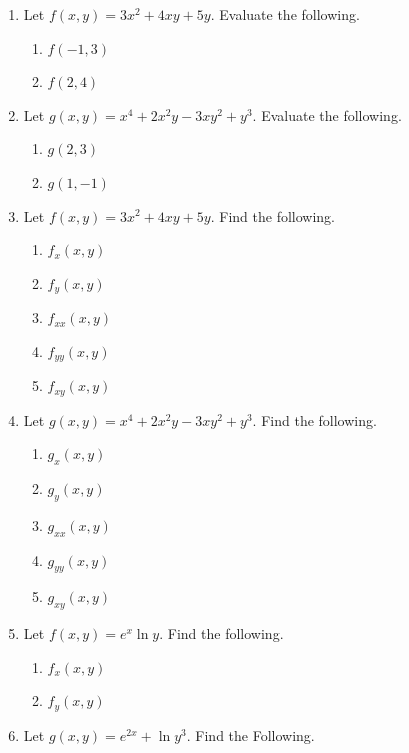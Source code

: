 \documentclass[
]{book}
\providecommand{\tightlist}{%
  \setlength{\itemsep}{0pt}\setlength{\parskip}{0pt}}
\theoremstyle{definition}
\theoremstyle{definition}
\theoremstyle{definition}
\theoremstyle{definition}
\theoremstyle{remark}
\begin{document}
\begin{enumerate}
\def\labelenumi{\arabic{enumi}.}
\tightlist
\item
  Let \(f(x,y)=3x^2+4xy+5y.\) Evaluate the following.

  \begin{enumerate}
  \def\labelenumii{\alph{enumii}.}
  \tightlist
  \item
    \(f(-1,3)\)
  \item
    \(f(2,4)\)
  \end{enumerate}
\item
  Let \(g(x,y)=x^4+2x^2y-3xy^2+y^3.\) Evaluate the following.

  \begin{enumerate}
  \def\labelenumii{\alph{enumii}.}
  \tightlist
  \item
    \(g(2,3)\)
  \item
    \(g(1,-1)\)
  \end{enumerate}
\item
  Let \(f(x,y)=3x^2+4xy+5y.\) Find the following.

  \begin{enumerate}
  \def\labelenumii{\alph{enumii}.}
  \tightlist
  \item
    \(f_x(x,y)\)
  \item
    \(f_y(x,y)\)
  \item
    \(f_{xx}(x,y)\)
  \item
    \(f_{yy}(x,y)\)
  \item
    \(f_{xy}(x,y)\)
  \end{enumerate}
\item
  Let \(g(x,y)=x^4+2x^2y-3xy^2+y^3.\) Find the following.

  \begin{enumerate}
  \def\labelenumii{\alph{enumii}.}
  \tightlist
  \item
    \(g_x(x,y)\)
  \item
    \(g_y(x,y)\)
  \item
    \(g_{xx}(x,y)\)
  \item
    \(g_{yy}(x,y)\)
  \item
    \(g_{xy}(x,y)\)
  \end{enumerate}
\item
  Let \(f(x,y)=e^x\ln y.\) Find the following.

  \begin{enumerate}
  \def\labelenumii{\alph{enumii}.}
  \tightlist
  \item
    \(f_x(x,y)\)
  \item
    \(f_y(x,y)\)
  \end{enumerate}
\item
  Let \(g(x,y)= e^{2x}+\ln y^3.\) Find the Following.


\end{enumerate}
\end{document}
